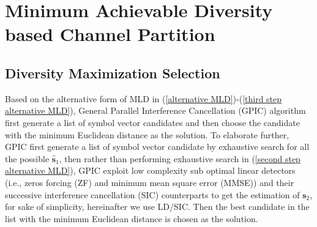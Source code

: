 \documentclass[12pt, draftclsnofoot, onecolumn]{IEEEtran}
\begin{document}
%



\section{Minimum Achievable Diversity based Channel Partition}
\subsection{Diversity Maximization Selection}
Based on the alternative form of MLD in (\ref{alternative MLD})-(\ref{third step alternative MLD}), General Parallel Interference Cancellation (GPIC) algorithm first generate a list of symbol vector candidates and then choose the candidate with the minimum Euclidean distance as the solution. To elaborate further, GPIC first generate a list of symbol vector candidate by exhaustive search for all the possible $\hat{\mathbf{s}}_{1}$, then rather than performing exhaustive search in (\ref{second step alternative MLD}), GPIC exploit low complexity sub optimal linear detectors (i.e., zeros forcing (ZF) and minimum mean square error (MMSE)) and their successive interference cancellation (SIC) counterparts to get the estimation of $\mathbf{s}_{2}$, for sake of simplicity, hereinafter we use LD/SIC. Then the best candidate in the list with the minimum Euclidean distance is chosen as the solution. 
\end{document}
